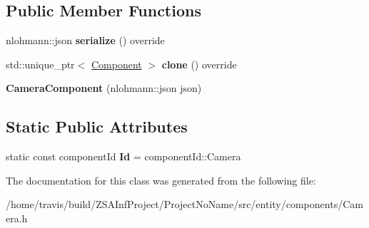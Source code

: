 \subsection*{Public Member Functions}
\begin{DoxyCompactItemize}
\item 
\hypertarget{classCameraComponent_a284867af54a50aac57966ece8f04bbd5}{nlohmann\-::json {\bfseries serialize} () override}\label{classCameraComponent_a284867af54a50aac57966ece8f04bbd5}

\item 
\hypertarget{classCameraComponent_a820ca92b75c521612c6f20b28dbcf2ab}{std\-::unique\-\_\-ptr$<$ \hyperlink{classComponent}{Component} $>$ {\bfseries clone} () override}\label{classCameraComponent_a820ca92b75c521612c6f20b28dbcf2ab}

\item 
\hypertarget{classCameraComponent_a9cc82e3d7e147397d7052c2e327196a3}{{\bfseries Camera\-Component} (nlohmann\-::json json)}\label{classCameraComponent_a9cc82e3d7e147397d7052c2e327196a3}

\end{DoxyCompactItemize}
\subsection*{Static Public Attributes}
\begin{DoxyCompactItemize}
\item 
\hypertarget{classCameraComponent_adf7a08c6a07570dca05839807c63fd53}{static const component\-Id {\bfseries Id} = component\-Id\-::\-Camera}\label{classCameraComponent_adf7a08c6a07570dca05839807c63fd53}

\end{DoxyCompactItemize}


The documentation for this class was generated from the following file\-:\begin{DoxyCompactItemize}
\item 
/home/travis/build/\-Z\-S\-A\-Inf\-Project/\-Project\-No\-Name/src/entity/components/Camera.\-h\end{DoxyCompactItemize}
